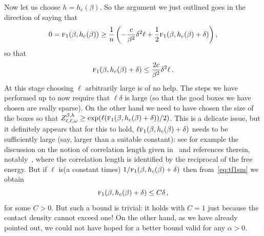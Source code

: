 \documentclass[AHL,Unicode,longabstracts]{cedram}
\newcommand{\gb}{\beta}
\newcommand{\gd}{\delta}
\newcommand{\go}{\omega}
\newcommand{\tf}{\textsc{f}} %
\begin{document}
Now let us choose $h=h_c(\gb)$. So the argument we just outlined goes in the direction of saying that
\begin{equation}
0 = \tf_1(\gb, h_c(\gb)) \ge \frac{1}{n} \left(-\frac{c}{\gb^2} \gd ^2 \ell+ \frac{1}{2} \tf_1(\gb, h_c(\gb)+ \gd) \right),
\end{equation}
so that
\begin{equation}
\tf_1(\gb, h_c(\gb)+ \gd)\le \frac{2c}{\gb^2} \gd ^2 \ell\,.\label{eq:tf1sm}
\end{equation}
At this stage choosing $\ell$ arbitrarily large is of no help. The steps we have performed up to now require that $ \ell \gd$ is large (so that the good boxes we have chosen are really sparse). On the other hand we need to have chosen the size of the boxes so that $Z_{\ell, \ell, \go}^{\gb, h} \ge \exp(\ell (\tf_1(\gb, h_c(\gb)+ \gd))/2)$. This is a delicate issue, but it definitely appears that for this to hold, $\ell \tf_1(\gb, h_c(\gb)+ \gd)$ needs to be sufficiently large (say, larger than a suitable constant): see for example the discussion on the notion of correlation length given in~\cite[Chapter~2]{cf:G} and references therein, notably~\cite{cf:GTalea}, where the correlation length is identified by the reciprocal of the free energy. But if $\ell$ is\linebreak(a constant times) $1/\tf_1(\gb, h_c(\gb)+ \gd)$ then from~\eqref{eq:tf1sm} we obtain
\begin{equation}\label{eq:trivb}
\tf_1(\gb, h_c(\gb)+ \gd)\le C \gd\,,
\end{equation}
for some $C>0$. But such a bound is trivial: it holds with $C=1$ just because the contact density cannot exceed one! On the other hand, as we have already pointed out, we could not have hoped for a better bound valid for any $\alpha>0$.
\end{document}
